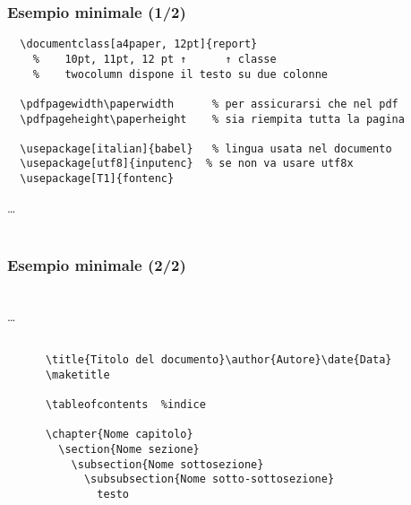 \begin{frame}[fragile]\transfade\centering
\frametitle{Esempio minimale (1/2)}
\begin{verbatim}
  \documentclass[a4paper, 12pt]{report}
    %    10pt, 11pt, 12 pt ↑      ↑ classe
    %    twocolumn dispone il testo su due colonne

  \pdfpagewidth\paperwidth      % per assicurarsi che nel pdf
  \pdfpageheight\paperheight    % sia riempita tutta la pagina

  \usepackage[italian]{babel}   % lingua usata nel documento
  \usepackage[utf8]{inputenc}  % se non va usare utf8x
  \usepackage[T1]{fontenc}
\end{verbatim}\dots\\~
\end{frame}
\begin{frame}[fragile]\transfade\centering
  \frametitle{Esempio minimale (2/2)}
  {\small~\\[-0.5cm]\dots\\[-0.5cm]\begin{verbatim}
    
      \title{Titolo del documento}\author{Autore}\date{Data}
      \maketitle

      \tableofcontents  %indice

      \chapter{Nome capitolo}
        \section{Nome sezione}
          \subsection{Nome sottosezione}
            \subsubsection{Nome sotto-sottosezione}
              testo

    
  \end{verbatim}}
\end{frame}

